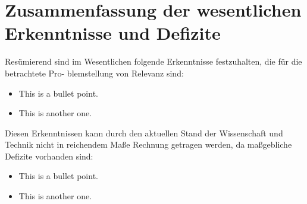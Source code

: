 \section{Zusammenfassung der wesentlichen Erkenntnisse und Defizite}\label{sec:grundlagensummary}



Resümierend sind im Wesentlichen folgende Erkenntnisse festzuhalten, die für die betrachtete Pro-
blemstellung von Relevanz sind:
\begin{itemize}
	\item This is a bullet point.
    \item This is another one.
\end{itemize}

Diesen Erkenntnissen kann durch den aktuellen Stand der Wissenschaft und Technik nicht in
reichendem Maße Rechnung getragen werden, da maßgebliche Defizite vorhanden sind:
\begin{itemize}
	\item This is a bullet point.
    \item This is another one.
\end{itemize}